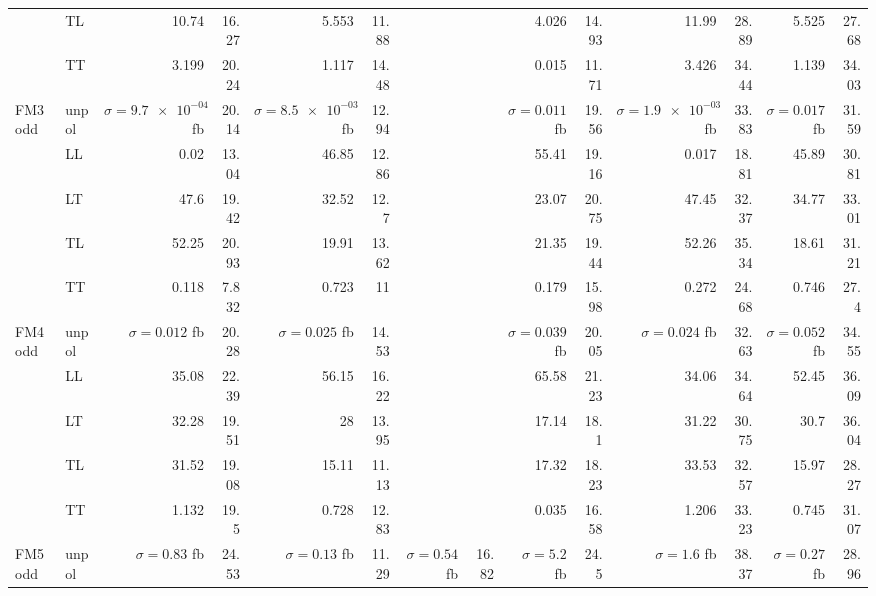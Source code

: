 \begin{table}[h]
{\begin{tabular}{llrrrrrrrrrrrr}
 & TL & \num{10.74} & \num{16.27} & \num{5.553} & \num{11.88} &  &  & \num{4.026} & \num{14.93} & \num{11.99} & \num{28.89} & \num{5.525} & \num{27.68} \\
 & TT & \num{3.199} & \num{20.24} & \num{1.117} & \num{14.48} &  &  & \num{0.015} & \num{11.71} & \num{3.426} & \num{34.44} & \num{1.139} & \num{34.03} \\
\midrule
\multirow{5}{*}{FM3odd}
 & unpol & $\sigma = \num{9.7e-04}$ fb & \num{20.14} & $\sigma = \num{8.5e-03}$ fb & \num{12.94} &  &  & $\sigma = \num{0.011}$ fb & \num{19.56} & $\sigma = \num{1.9e-03}$ fb & \num{33.83} & $\sigma = \num{0.017}$ fb & \num{31.59} \\
 & LL & \num{0.02} & \num{13.04} & \num{46.85} & \num{12.86} &  &  & \num{55.41} & \num{19.16} & \num{0.017} & \num{18.81} & \num{45.89} & \num{30.81} \\
 & LT & \num{47.6} & \num{19.42} & \num{32.52} & \num{12.7} &  &  & \num{23.07} & \num{20.75} & \num{47.45} & \num{32.37} & \num{34.77} & \num{33.01} \\
 & TL & \num{52.25} & \num{20.93} & \num{19.91} & \num{13.62} &  &  & \num{21.35} & \num{19.44} & \num{52.26} & \num{35.34} & \num{18.61} & \num{31.21} \\
 & TT & \num{0.118} & \num{7.832} & \num{0.723} & \num{11} &  &  & \num{0.179} & \num{15.98} & \num{0.272} & \num{24.68} & \num{0.746} & \num{27.4} \\
\midrule
\multirow{5}{*}{FM4odd}
 & unpol & $\sigma = \num{0.012}$ fb & \num{20.28} & $\sigma = \num{0.025}$ fb & \num{14.53} &  &  & $\sigma = \num{0.039}$ fb & \num{20.05} & $\sigma = \num{0.024}$ fb & \num{32.63} & $\sigma = \num{0.052}$ fb & \num{34.55} \\
 & LL & \num{35.08} & \num{22.39} & \num{56.15} & \num{16.22} &  &  & \num{65.58} & \num{21.23} & \num{34.06} & \num{34.64} & \num{52.45} & \num{36.09} \\
 & LT & \num{32.28} & \num{19.51} & \num{28} & \num{13.95} &  &  & \num{17.14} & \num{18.1} & \num{31.22} & \num{30.75} & \num{30.7} & \num{36.04} \\
 & TL & \num{31.52} & \num{19.08} & \num{15.11} & \num{11.13} &  &  & \num{17.32} & \num{18.23} & \num{33.53} & \num{32.57} & \num{15.97} & \num{28.27} \\
 & TT & \num{1.132} & \num{19.5} & \num{0.728} & \num{12.83} &  &  & \num{0.035} & \num{16.58} & \num{1.206} & \num{33.23} & \num{0.745} & \num{31.07} \\
\midrule
\multirow{5}{*}{FM5odd}
 & unpol & $\sigma = \num{0.83}$ fb & \num{24.53} & $\sigma = \num{0.13}$ fb & \num{11.29} & $\sigma = \num{0.54}$ fb & \num{16.82} & $\sigma = \num{5.2}$ fb & \num{24.5} & $\sigma = \num{1.6}$ fb & \num{38.37} & $\sigma = \num{0.27}$ fb & \num{28.96} \\

\end{tabular}}
\end{table}
